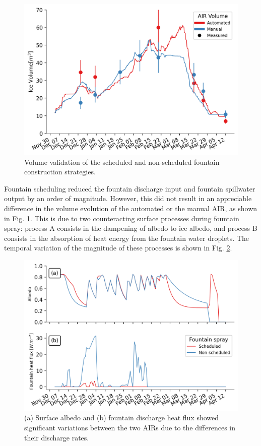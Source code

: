 \begin{figure}[htb] \includegraphics[width=\textwidth] {figs/CH_validation.png} \caption{Volume validation of the
		scheduled and non-scheduled fountain construction strategies.} \label{fig:validation} \end{figure}

Fountain scheduling reduced the fountain discharge input and fountain spillwater output by an order of
magnitude. However, this did not result in an appreciable difference in the volume evolution of the automated
or the manual \ac{AIR}, as shown in Fig. \ref{fig:validation}. This is due to two counteracting surface processes
during fountain spray: process A consists in the dampening of albedo to ice albedo, and process B consists in the
absorption of heat energy from the fountain water droplets. The temporal variation of the magnitude of these
processes is shown in Fig. \ref{fig:dis_processes}.

\begin{figure}[htb]
	\includegraphics[width=\textwidth]{figs/dis_processes.png}
	\caption{(a) Surface albedo  and (b) fountain discharge heat flux showed significant variations between the two
		 \ac{AIRs} due to the differences in their discharge rates.}
	\label{fig:dis_processes}
\end{figure}

